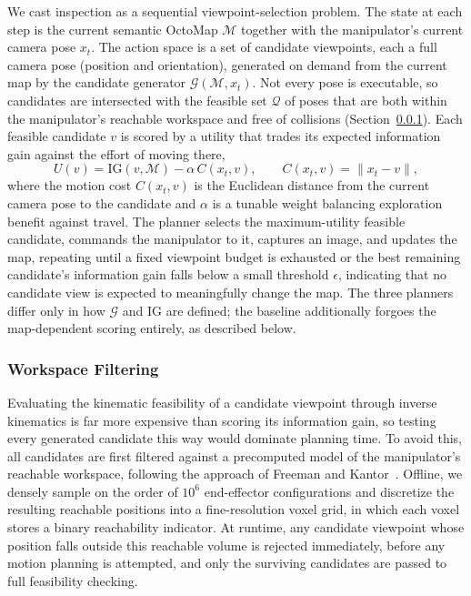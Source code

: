 We cast inspection as a sequential viewpoint-selection problem.
The state at each step is the current semantic OctoMap $\mathcal{M}$
together with the manipulator's current camera pose $x_t$.
The action space is a set of candidate viewpoints, each a full camera pose
(position and orientation), generated on demand from the current map by the
candidate generator $\mathcal{G}(\mathcal{M}, x_t)$.
Not every pose is executable, so candidates are intersected with the
feasible set $\mathcal{Q}$ of poses that are both within the manipulator's
reachable workspace and free of collisions
(Section~\ref{secWorkspaceFilter}).
Each feasible candidate $v$ is scored by a utility that trades its expected
information gain against the effort of moving there,
\begin{equation}
U(v) = \mathrm{IG}(v, \mathcal{M}) - \alpha\, C(x_t, v),
\qquad C(x_t, v) = \lVert x_t - v \rVert,
\label{eqUtility}
\end{equation}
where the motion cost $C(x_t, v)$ is the Euclidean distance from the
current camera pose to the candidate and $\alpha$ is a tunable weight
balancing exploration benefit against travel.
The planner selects the maximum-utility feasible candidate, commands the
manipulator to it, captures an image, and updates the map, repeating until
a fixed viewpoint budget is exhausted or the best remaining candidate's
information gain falls below a small threshold $\epsilon$, indicating
that no candidate view is expected to meaningfully change the map.
The three planners differ only in how $\mathcal{G}$ and $\mathrm{IG}$ are
defined; the baseline additionally forgoes the map-dependent scoring
entirely, as described below.

\subsubsection{Workspace Filtering} \label{secWorkspaceFilter}

Evaluating the kinematic feasibility of a candidate viewpoint through
inverse kinematics is far more expensive than scoring its information gain,
so testing every generated candidate this way would dominate planning time.
To avoid this, all candidates are first filtered against a precomputed
model of the manipulator's reachable workspace, following the approach of
Freeman and Kantor~\cite{Freeman2024AppleFruitletSizing}.
Offline, we densely sample on the order of $10^6$ end-effector
configurations and discretize the resulting reachable positions into a
fine-resolution voxel grid, in which each voxel stores a binary
reachability indicator.
At runtime, any candidate viewpoint whose position falls outside this
reachable volume is rejected immediately, before any motion planning is
attempted, and only the surviving candidates are passed to full feasibility
checking.

